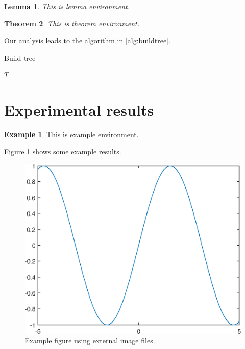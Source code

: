 \documentclass[10pt,reqno,final]{article}
\theoremstyle{plain}
\newtheorem{theorem}{Theorem}[section]
\newtheorem{lemma}[theorem]{Lemma}
\theoremstyle{definition}
\newtheorem{example}{Example}
\theoremstyle{remark}
\begin{document}
\lipsum[40]

\begin{lemma}
  This is lemma environment.
\end{lemma}


\begin{theorem}
  This is theorem environment.
\end{theorem}


Our analysis leads to the algorithm in \ref{alg:buildtree}.

\begin{algorithm}
\caption{Build tree}
\label{alg:buildtree}
\begin{algorithmic}
\ENDWHILE
\RETURN $T$
\end{algorithmic}
\end{algorithm}

\lipsum[41]

\section{Experimental results}
\label{sec:experiments}

\lipsum[45-46]

\begin{example}
  This is example environment.
\end{example}

Figure \ref{fig:a} shows some example results.

\begin{figure}[htp!]
  \centering
  \includegraphics[width=0.48\linewidth]{fig1}
  \caption{Example figure using external image files.}
  \label{fig:a}
\end{figure}
\end{document}
